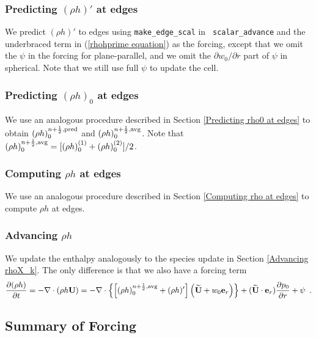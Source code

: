 \subsubsection{Predicting $(\rho h)'$ at edges}\label{Predicting rhohprime at edges}
We predict $(\rho h)'$ to edges using {\tt make\_edge\_scal} in {\tt
scalar\_advance} and the underbraced term in (\ref{rhohprime
equation}) as the forcing, except that we omit the $\psi$ in the
forcing for plane-parallel, and we omit the $\partial w_0/\partial r$
part of $\psi$ in spherical.  Note that we still use full $\psi$ to
update the cell.

\subsubsection{Predicting $(\rho h)_0$ at edges}
We use an analogous procedure described in Section \ref{Predicting
rho0 at edges} to obtain $(\rho h)_0^{n+\frac{1}{2},\rm{pred}}$ and $(\rho
h)_0^{n+\frac{1}{2},\rm{avg}}$.  Note that $(\rho h)_0^{n+\frac{1}{2},{\rm avg}} =
[(\rho h)_0^{(1)} + (\rho h)_0^{(2)}]/2$.

\subsubsection{Computing $\rho h$ at edges}
We use an analogous procedure described in Section \ref{Computing rho
at edges} to compute $\rho h$ at edges.

\subsubsection{Advancing $\rho h$}
We update the enthalpy analogously to the species update in 
Section \ref{Advancing rhoX_k}.  The only difference is that we also 
have a forcing term
\begin{equation}
\frac{\partial(\rho h)}{\partial t} = -\nabla\cdot(\rho h{\bf U}) = 
-\nabla\cdot\left\{\left[(\rho h)_0^{n+\frac{1}{2},{\rm avg}} 
+ (\rho h)'\right]\left(\widetilde{{\bf U}} + w_0{\bf e}_r\right)\right\} + (\widetilde{{\bf U}} \cdot \mathbf{e}_r)\frac{\partial p_0}{\partial r} + \psi  \enskip .
\end{equation}

\subsection{Summary of Forcing}

